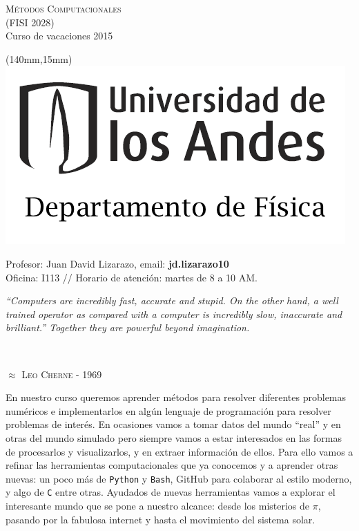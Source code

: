 \documentclass[letterpaper,10pt,onecolumn]{article}
\begin{document}
\thispagestyle{empty}
\begin{flushleft}


\textsc{\huge Métodos Computacionales}\\[0.01cm]

\normalsize (FISI 2028) \\
Curso de vacaciones 2015

\end{flushleft}

		\begin{textblock*}{20mm}(140mm,15mm)
  			\includegraphics[height=30 mm]{andes.png}
		\end{textblock*}

\noindent
Profesor: Juan David Lizarazo, email: \textbf{jd.lizarazo10}\\
Oficina: I113 // Horario de atención: martes de 8 a 10 AM. \\ 
\vspace{0.3cm}

\hfill\begin{minipage}{\dimexpr\textwidth-3cm}
\begin{flushright}\textit{``Computers are incredibly fast, accurate and stupid. On the other hand, a well trained operator as compared with a computer is incredibly slow, inaccurate and brilliant.'' Together they are powerful beyond imagination.}\end{flushright}
\end{minipage}

\noindent \\[-0.5cm]
\begin{flushright}\textsc{$\approx$ Leo Cherne - 1969}\end{flushright}

\vspace{0.1cm}

En nuestro curso queremos aprender métodos para resolver diferentes problemas numéricos e implementarlos en algún lenguaje de programación para resolver problemas de interés. En ocasiones vamos a tomar datos del mundo ``real'' y en otras del mundo simulado pero siempre vamos a estar interesados en las formas de procesarlos y visualizarlos, y en extraer información de ellos. Para ello vamos a refinar las herramientas computacionales que ya conocemos y a aprender otras nuevas: un poco más de \verb+Python+ y \verb+Bash+, GitHub para colaborar al estilo moderno, y algo de \verb+C+ entre otras. Ayudados de nuevas herramientas vamos a explorar el interesante mundo que se pone a nuestro alcance: desde los misterios de $\pi$, pasando por la fabulosa internet y hasta el movimiento del sistema solar.
\end{document}
